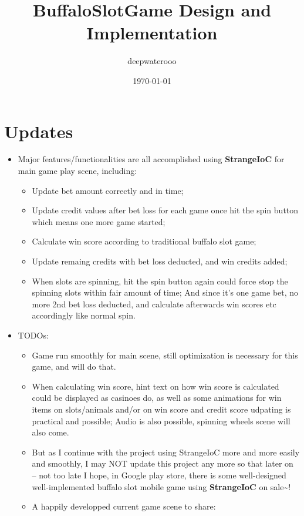 \documentclass[9pt, b5paper]{article}
\author{deepwaterooo}
\date{\today}
\title{BuffaloSlotGame Design and Implementation}
\begin{document}
\maketitle
\tableofcontents


\section{Updates}
\label{sec-1}
\begin{itemize}
\item Major features/functionalities are all accomplished using \textbf{StrangeIoC} for main game play scene, including: 
\begin{itemize}
\item Update bet amount correctly and in time;
\item Update credit values after bet loss for each game once hit the spin button which means one more game started;
\item Calculate win score according to traditional buffalo slot game;
\item Update remaing credits with bet loss deducted, and win credits added;
\item When slots are spinning, hit the spin button again could force stop the spinning slots within fair amount of time; And since it's one game bet, no more 2nd bet loss deducted, and calculate afterwards win scores etc accordingly like normal spin.
\end{itemize}
\item TODOs: 
\begin{itemize}
\item Game run smoothly for main scene, still optimization is necessary for this game, and will do that.
\item When calculating win score, hint text on how win score is calculated could be displayed as casinoes do, as well as some animations for win items on slots/animals and/or on win score and credit score udpating is practical and possible; Audio is also possible, spinning wheels scene will also come.
\item But as I continue with the project using StrangeIoC more and more easily and smoothly, I may NOT update this project any more so that later on -- not too late I hope, in Google play store, there is some well-designed well-implemented buffalo slot mobile game using \textbf{StrangeIoC} on sale\textasciitilde{}!
\item A happily developped current game scene to share:
\end{itemize}

\end{itemize}
\end{document}
